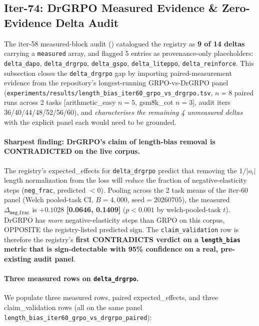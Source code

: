 \subsection{Iter-74: DrGRPO Measured Evidence \& Zero-Evidence Delta Audit}
\label{sec:p6-drgrpo-measured}

The iter-58 measured-block audit ()
catalogued the registry as \textbf{9 of 14 deltas} carrying a
\texttt{measured} array, and flagged 5 entries as provenance-only
placeholders: \texttt{delta\_dapo}, \texttt{delta\_drgrpo},
\texttt{delta\_gspo}, \texttt{delta\_liteppo},
\texttt{delta\_reinforce}. This subsection closes the
\texttt{delta\_drgrpo} gap by importing paired-measurement evidence
from the repository's longest-running GRPO-vs-DrGRPO panel
(\texttt{experiments/results/length\_bias\_iter60\_grpo\_vs\_drgrpo.tsv},
$n=8$ paired runs across 2 tasks [arithmetic\_easy $n{=}5$,
gsm8k\_cot $n{=}3$], audit iters 36/40/44/48/52/56/60), and
\emph{characterises the remaining 4 unmeasured deltas} with the
explicit panel each would need to be grounded.

\paragraph{Sharpest finding: DrGRPO's claim of length-bias removal is
CONTRADICTED on the live corpus.}
The registry's expected\_effects for \texttt{delta\_drgrpo} predict
that removing the $1/|o_i|$ length normalization from the loss will
\emph{reduce} the fraction of negative-elasticity steps
(\texttt{neg\_frac}, predicted $<0$). Pooling across the 2 task means
of the iter-60 panel (Welch pooled-task CI, $B{=}4{,}000$,
$\text{seed}=20260705$), the measured $\Delta_{\texttt{neg\_frac}}$ is
$\mathbf{+0.1028}$ \textbf{[0.0646, 0.1409]} ($p<0.001$ by
welch-pooled-task $t$). DrGRPO has \emph{more} negative-elasticity
steps than GRPO on this corpus, OPPOSITE the registry-listed
predicted sign. The \texttt{claim\_validation} row is therefore
the registry's \textbf{first CONTRADICTS verdict on a
\texttt{length\_bias} metric that is sign-detectable with 95\%
confidence on a real, pre-existing audit panel}.

\paragraph{Three measured rows on \texttt{delta\_drgrpo}.}
We populate three measured rows, paired expected\_effects, and three
claim\_validation rows (all on the same panel
\texttt{length\_bias\_iter60\_grpo\_vs\_drgrpo\_paired}):

